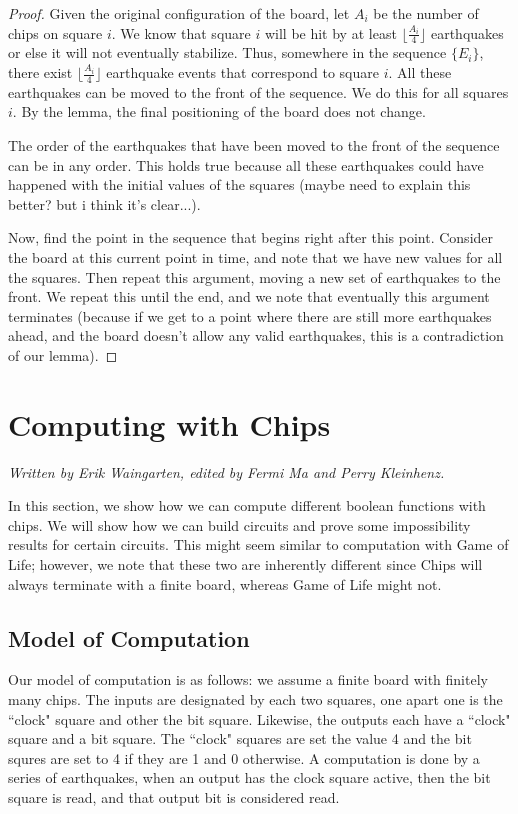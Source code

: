 \documentclass[runningheads,a4paper]{llncs}
\begin{document}
\begin{proof}
Given the original configuration of the board, let $A_i$ be the number of chips on square $i$. We know that square $i$ will be hit by at least $\lfloor \frac{A_i}{4} \rfloor$ earthquakes or else it will not eventually stabilize. Thus, somewhere in the sequence $\{E_i\}$, there exist $\lfloor \frac{A_i}{4} \rfloor$ earthquake events that correspond to square $i$. All these earthquakes can be moved to the front of the sequence. We do this for all squares $i$. By the lemma, the final positioning of the board does not change.

The order of the earthquakes that have been moved to the front of the sequence can be in any order. This holds true because all these earthquakes could have happened with the initial values of the squares (maybe need to explain this better? but i think it's clear...).

Now, find the point in the sequence that begins right after this point. Consider the board at this current point in time, and note that we have new values for all the squares. Then repeat this argument, moving a new set of earthquakes to the front. We repeat this until the end, and we note that eventually this argument terminates (because if we get to a point where there are still more earthquakes ahead, and the board doesn't allow any valid earthquakes, this is a contradiction of our lemma).

\end{proof}

\section{Computing with Chips}

\emph{Written by Erik Waingarten, edited by Fermi Ma and Perry Kleinhenz.}

In this section, we show how we can compute different boolean functions with chips. We will show how we can build circuits and prove some impossibility results for certain circuits. This might seem similar to computation with Game of Life; however, we note that these two are inherently different since Chips will always terminate with a finite board, whereas Game of Life might not.

\subsection{Model of Computation}

Our model of computation is as follows: we assume a finite board with finitely many chips. The inputs are designated by each two squares, one apart one is the ``clock" square and other the bit square. Likewise, the outputs each have a ``clock" square and a bit square. The ``clock" squares are set the value 4 and the bit squres are set to 4 if they are 1 and 0 otherwise. A computation is done by a series of earthquakes, when an output has the clock square active, then the bit square is read, and that output bit is considered read. 
\end{document}

